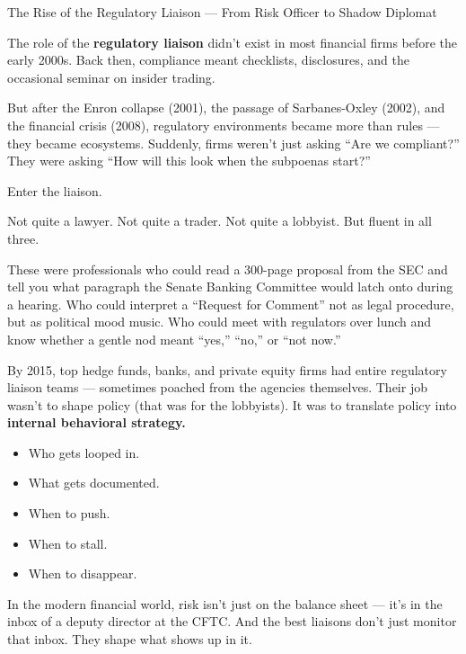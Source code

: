\begin{HistoricalSidebar}{The Rise of the Regulatory Liaison --- From Risk Officer to Shadow Diplomat}

The role of the \textbf{regulatory liaison} didn’t exist in most financial firms before the early 2000s.
Back then, compliance meant checklists, disclosures, and the occasional seminar on insider trading.

\medskip

But after the Enron collapse (2001), the passage of Sarbanes-Oxley (2002), and the financial crisis (2008), 
regulatory environments became more than rules — they became ecosystems.
Suddenly, firms weren’t just asking “Are we compliant?”
They were asking “How will this look when the subpoenas start?”

\medskip

Enter the liaison.

\medskip

Not quite a lawyer.
Not quite a trader.
Not quite a lobbyist.
But fluent in all three.

\medskip

These were professionals who could read a 300-page proposal from the SEC and tell you what paragraph the Senate 
Banking Committee would latch onto during a hearing.
Who could interpret a “Request for Comment” not as legal procedure, but as political mood music.
Who could meet with regulators over lunch and know whether a gentle nod meant “yes,” “no,” or “not now.”

\medskip

By 2015, top hedge funds, banks, and private equity firms had entire regulatory liaison teams — sometimes poached 
from the agencies themselves.
Their job wasn’t to shape policy (that was for the lobbyists).
It was to translate policy into \textbf{internal behavioral strategy.}

\medskip

\begin{itemize}
  \item Who gets looped in.
  \item What gets documented.
  \item When to push.
  \item When to stall.
  \item When to disappear.
\end{itemize}

\medskip

In the modern financial world, risk isn’t just on the balance sheet — it’s in the inbox of a deputy director at the CFTC.
And the best liaisons don’t just monitor that inbox.
They shape what shows up in it.

\end{HistoricalSidebar}

